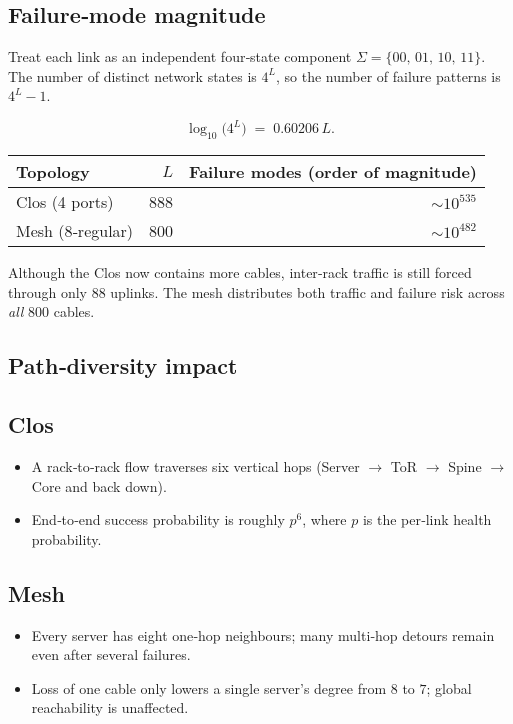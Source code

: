 \subsection{Failure‑mode magnitude}

Treat each link as an independent four‑state component
$\Sigma = \{00,\,01,\,10,\,11\}$.  The number of distinct network
states is $4^{L}$, so the number of failure patterns is $4^{L}-1$.

\[
\log_{10}\!\bigl(4^{L}\bigr) \;=\; 0.60206\,L.
\]

\begin{center}
\begin{tabular}{@{}lrr@{}}
\toprule
Topology & $L$ & Failure modes (order of magnitude)\\
\midrule
Clos (4 ports) & 888 & $\sim 10^{535}$\\
Mesh ($8$‑regular) & 800 & $\sim 10^{482}$\\
\bottomrule
\end{tabular}
\end{center}

Although the Clos now contains more cables, inter‑rack traffic is still
forced through only 88 uplinks.  The mesh distributes both traffic and
failure risk across \emph{all} 800 cables.

\subsection{Path‑diversity impact}

\subsection*{Clos}

\begin{itemize}
  \item A rack‑to‑rack flow traverses six vertical hops
        (Server $\rightarrow$ ToR $\rightarrow$ Spine $\rightarrow$
        Core and back down).
  \item End‑to‑end success probability is roughly $p^{6}$, where
        $p$ is the per‑link health probability.
\end{itemize}

\subsection*{Mesh}

\begin{itemize}
  \item Every server has eight one‑hop neighbours; many multi‑hop
        detours remain even after several failures.
  \item Loss of one cable only lowers a single server’s degree
        from $8$ to $7$; global reachability is unaffected.
\end{itemize}

